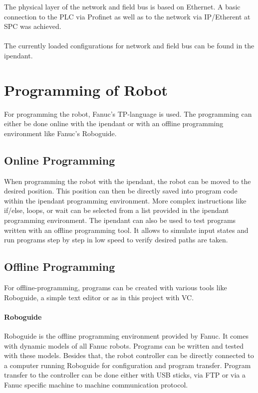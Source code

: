 The physical layer of the network and field bus is based on Ethernet. A basic connection to the PLC via Profinet as well as to the network via IP/Etherent at \ac{SPC} was achieved.\\
\\
The currently loaded configurations for network and field bus can be found in the \ac{ipendant}.






\section{Programming of Robot}

For programming the robot, Fanuc's TP-language is used. The programming can either be done online with the \gls{ipendant} or with an offline programming environment like Fanuc's Roboguide. 

\subsection{Online Programming}
When programming the robot with the \gls{ipendant}, the robot can be moved to the desired position. This position can then be directly saved into program code within the \gls{ipendant} programming environment. More complex instructions like if/else, loops, or wait can be selected from a list provided in the \gls{ipendant} programming environment. The \gls{ipendant} can also be used to test programs written with an offline programming tool. It allows to simulate input states and run programs step by step in low speed to verify desired paths are taken.

\subsection{Offline Programming}
For offline-programming, programs can be created with various tools like Roboguide, a simple text editor or as in this project with \ac{VC}.

\paragraph{Roboguide}
Roboguide is the offline programming environment provided by Fanuc. It comes with dynamic models of all Fanuc robots. Programs can be written and tested with these models. Besides that, the robot controller can be directly connected to a computer running Roboguide for configuration and program transfer. Program transfer to the controller can be done either with USB sticks, via FTP or via a Fanuc specific machine to machine communication protocol. 


